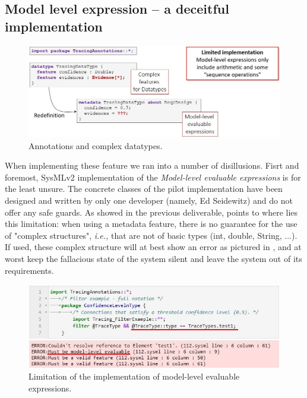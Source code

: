 \subsection{Model level expression -- a deceitful implementation}
\begin{figure}[h]     
	\centering
	\includegraphics[width=.95\linewidth]{images/strategy4-metadatatype.jpg}
	\caption{Annotations and complex datatypes. }
	\label{fig:metadatatypes}
\end{figure}
When implementing these feature we ran into a number of disillusions. Fisrt and foremost, SysMLv2 implementation of the \textit{Model-level evaluable expressions} is for the least unsure. The concrete classes of the pilot implementation have been designed and written by only one developer (namely, Ed Seidewitz) and do not offer any safe guards. As showed in the previous deliverable,  points to where lies this limitation: when using a metadata feature, there is no guarantee for the use of "complex structures", \textit{i.e.,} that are not of basic types (int, double, String, ...). If used, these complex structure will at best show an error as pictured in , and at worst keep the fallacious state of the system silent and leave the system out of its requirements.

\begin{figure}[ht]     
	\centering
	\includegraphics[width=.99\linewidth]{images/viz_filterexample_err.JPG}
	\caption{Limitation of the implementation of model-level evaluable expressions.}
	\label{fig:filtererr}
\end{figure}